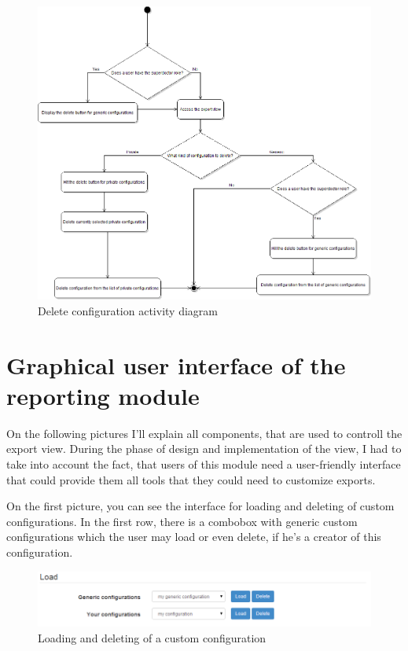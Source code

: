 \documentclass[thesis=B,english]{FITthesis}[2012/10/20]
\begin{document}
\begin{figure}[ht]\centering
\includegraphics[width=0.5\paperwidth]{deleteConfigurationDiagram}
		\caption{Delete configuration activity diagram}
\end{figure}



\section{Graphical user interface of the reporting module}
On the following pictures I'll explain all components, that are used to controll the export view. During the phase of design and implementation of the view, I had to take into account the fact, that users of this module need a user-friendly interface that could provide them all tools that they could need to customize exports.

On the first picture, you can see the interface for loading and deleting of custom configurations. In the first row, there is a combobox with generic custom configurations which the user may load or even delete, if he's a creator of this configuration.

\begin{figure}[ht]\centering
\includegraphics[width=0.5\paperwidth]{load}
		\caption{Loading and deleting of a custom configuration}
\end{figure}
\end{document}
